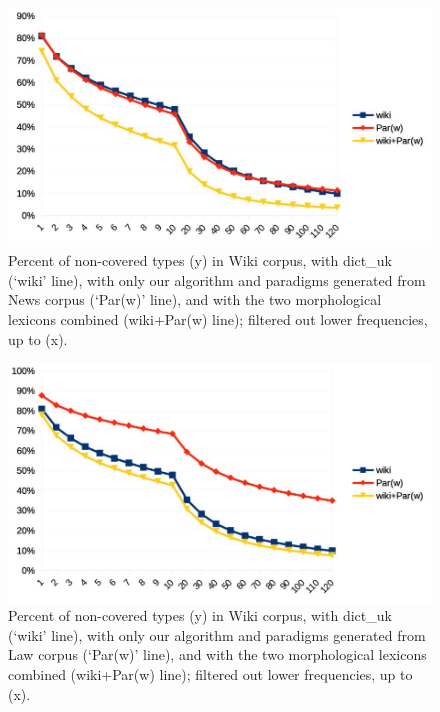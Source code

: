 \documentclass[11pt,a4paper]{article}
\begin{document}
\begin{figure}
	\includegraphics[width=\linewidth]{evaluation-coverage-wikiN.jpg}
	\caption{Percent of non-covered types (y) in Wiki corpus, with dict\_uk (`wiki' line), with only our algorithm and paradigms generated from News corpus (`Par(w)' line), and with the two morphological lexicons combined (wiki+Par(w) line); filtered out lower frequencies, up to (x).}
	\label{fig:pcNoTypWikiN}
\end{figure}

\begin{figure}
	\includegraphics[width=\linewidth]{evaluation-coverage-wikiL.jpg}
	\caption{Percent of non-covered types (y) in Wiki corpus, with dict\_uk (`wiki' line), with only our algorithm and paradigms generated from Law corpus (`Par(w)' line), and with the two morphological lexicons combined (wiki+Par(w) line); filtered out lower frequencies, up to (x).}
	\label{fig:pcNoTypWikiL}
\end{figure}
\end{document}
